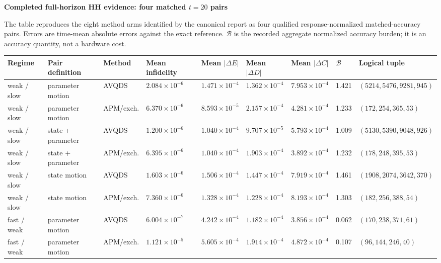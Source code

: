 \documentclass[9pt,letterpaper,landscape]{article}
\begin{document}
\newpage
{\LARGE\bfseries\color{navy} Completed full-horizon HH evidence: four matched \(t=20\) pairs}

{\small The table reproduces the eight method arms identified by the canonical report as four qualified response-normalized matched-accuracy pairs. Errors are time-mean absolute errors against the exact reference. \(\mathcal B\) is the recorded aggregate normalized accuracy burden; it is an accuracy quantity, not a hardware cost.}

\vspace{3pt}
\begin{tabular}{@{}p{1.16in}p{1.08in}p{0.72in}C{0.78in}C{0.78in}C{0.78in}C{0.78in}C{0.58in}C{1.32in}@{}}
\toprule
Regime & Pair definition & Method & Mean infidelity & Mean \(|\Delta E|\) & Mean \(|\Delta D|\) & Mean \(|\Delta C|\) & \(\mathcal B\) & Logical tuple \\
\midrule
weak / slow & parameter motion & AVQDS & \(2.084\!\times\!10^{-6}\) & \(1.471\!\times\!10^{-4}\) & \(1.362\!\times\!10^{-4}\) & \(7.953\!\times\!10^{-4}\) & 1.421 & \((5214,5476,9281,945)\) \\
weak / slow & parameter motion & APM/exch. & \(6.370\!\times\!10^{-6}\) & \(8.593\!\times\!10^{-5}\) & \(2.157\!\times\!10^{-4}\) & \(4.281\!\times\!10^{-4}\) & 1.233 & \((172,254,365,53)\) \\
weak / slow & state + parameter & AVQDS & \(1.200\!\times\!10^{-6}\) & \(1.040\!\times\!10^{-4}\) & \(9.707\!\times\!10^{-5}\) & \(5.793\!\times\!10^{-4}\) & 1.009 & \((5130,5390,9048,926)\) \\
weak / slow & state + parameter & APM/exch. & \(6.395\!\times\!10^{-6}\) & \(1.040\!\times\!10^{-4}\) & \(1.903\!\times\!10^{-4}\) & \(3.892\!\times\!10^{-4}\) & 1.232 & \((178,248,395,53)\) \\
weak / slow & state motion & AVQDS & \(1.603\!\times\!10^{-6}\) & \(1.506\!\times\!10^{-4}\) & \(1.447\!\times\!10^{-4}\) & \(7.919\!\times\!10^{-4}\) & 1.461 & \((1908,2074,3642,370)\) \\
weak / slow & state motion & APM/exch. & \(7.360\!\times\!10^{-6}\) & \(1.328\!\times\!10^{-4}\) & \(1.228\!\times\!10^{-4}\) & \(8.193\!\times\!10^{-4}\) & 1.303 & \((182,256,388,54)\) \\
fast / weak & parameter motion & AVQDS & \(6.004\!\times\!10^{-7}\) & \(4.242\!\times\!10^{-4}\) & \(1.182\!\times\!10^{-4}\) & \(3.856\!\times\!10^{-4}\) & 0.062 & \((170,238,371,61)\) \\
fast / weak & parameter motion & APM/exch. & \(1.121\!\times\!10^{-5}\) & \(5.605\!\times\!10^{-4}\) & \(1.914\!\times\!10^{-4}\) & \(4.872\!\times\!10^{-4}\) & 0.107 & \((96,144,246,40)\) \\
\bottomrule
\end{tabular}
\end{document}
